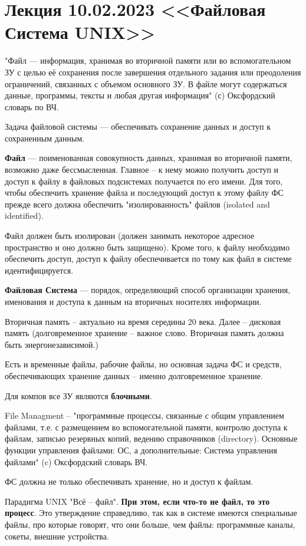 \documentclass[a4paper,12pt]{article}
\begin{document}
\section{Лекция 10.02.2023 <<Файловая Система UNIX>>}

"Файл --- информация, хранимая во вторичной памяти или во вспомогательном ЗУ с целью её сохранения после завершения отдельного задания или преодоления ограничений, связанных с объемом основного ЗУ. В файле могут содержаться данные, программы, тексты и любая другая информация" (с) Оксфордский словарь по ВЧ.


Задача файловой системы --- обеспечивать сохранение данных и доступ к сохраненным данным.

\textbf{Файл} --- поименованная совокупность данных, хранимая во вторичной памяти, возможно даже бессмысленная. Главное -- к нему можно получить доступ и доступ к файлу в файловых подсистемах получается по его имени. Для того, чтобы обеспечить хранение файла и последующий доступ к этому файлу ФС прежде всего должна обеспечить "изолированность" файлов (isolated and identified).

Файл должен быть изолирован (должен занимать некоторое адресное пространство и оно должно быть защищено). Кроме того, к файлу необходимо обеспечить доступ, доступ к файлу обеспечивается по тому как файл в системе идентифицируется.

\textbf{Файловая Система} --- порядок, определяющий способ организации хранения, именования и доступа к данным на вторичных носителях информации.

Вторичная память -- актуально на время середины 20 века. Далее -- дисковая память (долговременное хранение -- важное слово. Вторичная память должна быть энергонезависимой.)

Есть и временные файлы, рабочие файлы, но основная задача ФС и средств, обеспечивающих хранение данных -- именно долговременное хранение.

Для компов все ЗУ являются \textbf{блочными}.

File Managment -- "программные процессы, связанные с общим управлением файлами, т.е. с размещением во вспомогательной памяти, контролю доступа к файлам, записью резервных копий, ведению справочников (directory). Основные функции управления файлами: ОС, а дополнительные: Система управления файлами" (c) Оксфордский словарь ВЧ.

ФС должна не только обеспечивать хранение, но и доступ к файлам.

Парадигма UNIX "Всё -- файл". \textbf{При этом, если что-то не файл, то это процесс}. Это утверждение справедливо, так как в системе имеются специальные файлы, про которые говорят, что они больше, чем файлы: программные каналы, сокеты, внешние устройства.
\end{document}
